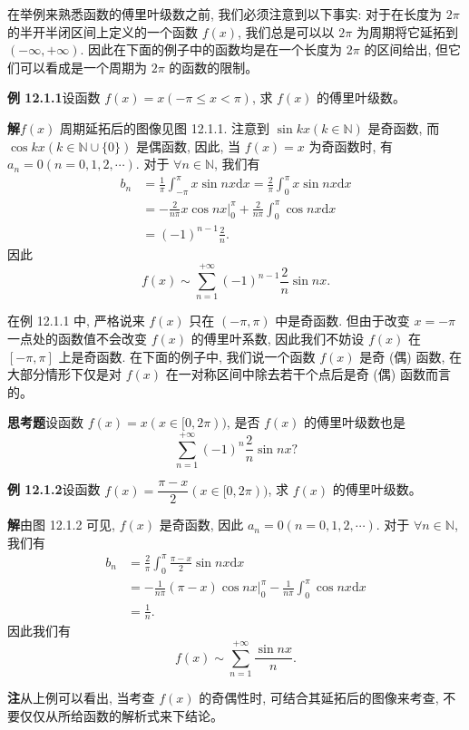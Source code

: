 \documentclass[UTF8, 12pt, fontset=fandol, oneside]{ctexart}
\begin{document}
在举例来熟悉函数的傅里叶级数之前, 我们必须注意到以下事实: 对于在长度为 $2\pi$ 的半开半闭区间上定义的一个函数 $f(x)$, 我们总是可以以 $2\pi$ 为周期将它延拓到 $(-\infty,+\infty)$. 因此在下面的例子中的函数均是在一个长度为 $2\pi$ 的区间给出, 但它们可以看成是一个周期为 $2\pi$ 的函数的限制。

\noindent\textbf{例 12.1.1}\quad 设函数 $f(x)=x(-\pi\leqslant x<\pi)$, 求 $f(x)$ 的傅里叶级数。

\noindent\textbf{解}\quad $f(x)$ 周期延拓后的图像见图 12.1.1. 注意到 $\sin kx(k\in\mathbb N)$ 是奇函数, 而 $\cos kx(k\in\mathbb N\cup\{0\})$ 是偶函数, 因此, 当 $f(x)=x$ 为奇函数时, 有 $a_n=0(n=0,1,2,\cdots)$. 对于 $\forall n\in\mathbb N$, 我们有
\[
\begin{aligned}
  b_n
  &=\frac1\pi\int_{-\pi}^{\pi}x\sin nx\mathrm dx
  =\frac2\pi\int_0^\pi x\sin nx\mathrm dx\\
  &=-\frac2{n\pi}x\cos nx\bigg|_0^\pi+\frac2{n\pi}\int_0^\pi\cos nx\mathrm dx\\
  &=(-1)^{n-1}\frac2n.
\end{aligned}
\]
因此
\[
  f(x)\sim\sum_{n=1}^{+\infty}(-1)^{n-1}\frac2n\sin nx.
\]

在例 12.1.1 中, 严格说来 $f(x)$ 只在 $(-\pi,\pi)$ 中是奇函数. 但由于改变 $x=-\pi$ 一点处的函数值不会改变 $f(x)$ 的傅里叶系数, 因此我们不妨设 $f(x)$ 在 $[-\pi,\pi]$ 上是奇函数. 在下面的例子中, 我们说一个函数 $f(x)$ 是奇 (偶) 函数, 在大部分情形下仅是对 $f(x)$ 在一对称区间中除去若干个点后是奇 (偶) 函数而言的。

\noindent\textbf{思考题}\quad 设函数 $f(x)=x(x\in[0,2\pi))$, 是否 $f(x)$ 的傅里叶级数也是
\[
  \sum_{n=1}^{+\infty}(-1)^n\frac2n\sin nx?
\]

\noindent\textbf{例 12.1.2}\quad 设函数 $f(x)=\dfrac{\pi-x}{2}(x\in[0,2\pi))$, 求 $f(x)$ 的傅里叶级数。

\noindent\textbf{解}\quad 由图 12.1.2 可见, $f(x)$ 是奇函数, 因此 $a_n=0(n=0,1,2,\cdots)$. 对于 $\forall n\in\mathbb N$, 我们有
\[
\begin{aligned}
  b_n
  &=\frac2\pi\int_0^\pi\frac{\pi-x}{2}\sin nx\mathrm dx\\
  &=-\frac1{n\pi}(\pi-x)\cos nx\bigg|_0^\pi
    -\frac1{n\pi}\int_0^\pi\cos nx\mathrm dx\\
  &=\frac1n.
\end{aligned}
\]
因此我们有
\[
  f(x)\sim\sum_{n=1}^{+\infty}\frac{\sin nx}{n}.
\]

\noindent\textbf{注}\quad 从上例可以看出, 当考查 $f(x)$ 的奇偶性时, 可结合其延拓后的图像来考查, 不要仅仅从所给函数的解析式来下结论。
\end{document}
